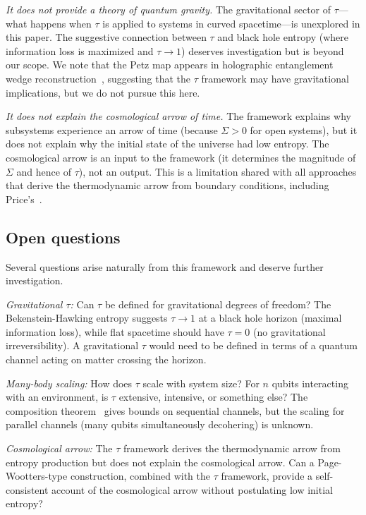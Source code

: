 \documentclass[12pt]{article}
\theoremstyle{definition}
\theoremstyle{remark}
\newcommand{\tauasym}{\tau}
\begin{document}
\emph{It does not provide a theory of quantum gravity.}
The gravitational sector of $\tauasym$---what happens when
$\tauasym$ is applied to systems in curved spacetime---is
unexplored in this paper.  The suggestive connection between
$\tauasym$ and black hole entropy (where information loss is
maximized and $\tauasym \to 1$) deserves investigation but is
beyond our scope.  We note that the Petz map appears in
holographic entanglement wedge reconstruction~\cite{Chen2020},
suggesting that the $\tauasym$ framework may have gravitational
implications, but we do not pursue this here.

\emph{It does not explain the cosmological arrow of time.}
The framework explains why subsystems experience an arrow of time
(because $\Sigma > 0$ for open systems), but it does not explain
why the initial state of the universe had low entropy.  The
cosmological arrow is an input to the framework (it determines
the magnitude of $\Sigma$ and hence of $\tauasym$), not an output.
This is a limitation shared with all approaches that derive the
thermodynamic arrow from boundary conditions, including
Price's~\cite{Price1996}.

\subsection{Open questions}

Several questions arise naturally from this framework and deserve
further investigation.

\emph{Gravitational $\tauasym$:}
Can $\tauasym$ be defined for gravitational degrees of freedom?
The Bekenstein-Hawking entropy suggests $\tauasym \to 1$ at a
black hole horizon (maximal information loss), while flat
spacetime should have $\tauasym = 0$ (no gravitational
irreversibility).  A gravitational $\tauasym$ would need to be
defined in terms of a quantum channel acting on matter crossing
the horizon.

\emph{Many-body scaling:}
How does $\tauasym$ scale with system size?  For $n$ qubits
interacting with an environment, is $\tauasym$ extensive,
intensive, or something else?  The composition
theorem~\cite{Huang2026} gives bounds on sequential channels,
but the scaling for parallel channels (many qubits simultaneously
decohering) is unknown.

\emph{Cosmological arrow:}
The $\tauasym$ framework derives the thermodynamic arrow from
entropy production but does not explain the cosmological arrow.
Can a Page-Wootters-type construction, combined with the
$\tauasym$ framework, provide a self-consistent account of the
cosmological arrow without postulating low initial entropy?
\end{document}
